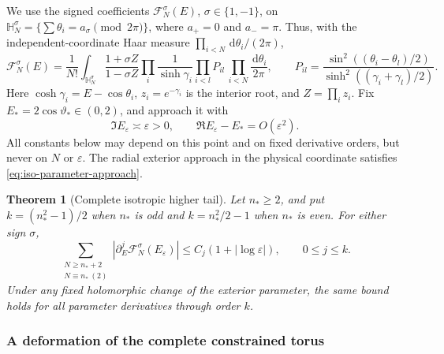 \documentclass[11pt]{article}
\numberwithin{equation}{section}
\newtheorem{theorem}{Theorem}[section]
\theoremstyle{definition}
\newcommand{\dd}{\,\mathrm d}
\newcommand{\eps}{\varepsilon}
\begin{document}
We use the signed coefficients $\mathcal F_N^\sigma({E})$,
$\sigma\in\{1,-1\}$, on
$\mathbb H_N^\sigma=\{\sum\theta_i=a_\sigma\pmod {2\pi}\}$,
where $a_+=0$ and $a_-=\pi$.  Thus, with the independent-coordinate
Haar measure $\prod_{i<N}\dd\theta_i/(2\pi)$,
\begin{equation}\label{eq:iso-tail-coefficient}
 \mathcal F_N^\sigma({E})=\frac1{N!}
 \int_{\mathbb H_N^\sigma}
 \frac{1+\sigma Z}{1-\sigma Z}
 \prod_i\frac1{\sinh\gamma_i}\prod_{i<l}P_{il}\,
 \prod_{i<N}\frac{\dd\theta_i}{2\pi},\qquad
 P_{il}=\frac{\sin^2((\theta_i-\theta_l)/2)}
                {\sinh^2((\gamma_i+\gamma_l)/2)}.
\end{equation}
Here $\cosh\gamma_i={E}-\cos\theta_i$, $z_i=e^{-\gamma_i}$
is the interior root, and $Z=\prod_i z_i$.
Fix ${E}_*=2\cos\vartheta_*\in(0,2)$, and approach it with
\begin{equation}\label{eq:iso-parameter-approach}
 \Im{E}_\eps\asymp\eps>0,
 \qquad \Re{E}_\eps-{E}_*=O(\eps^2).
\end{equation}
All constants below may depend on this point and on fixed derivative
orders, but never on $N$ or $\eps$.  The radial exterior approach in
the physical coordinate satisfies \eqref{eq:iso-parameter-approach}.

\begin{theorem}[Complete isotropic higher tail]\label{iso:tail}
Let $n_*\ge2$, and put $k=(n_*^2-1)/2$ when $n_*$ is odd and
$k=n_*^2/2-1$ when $n_*$ is even.  For either sign $\sigma$,
\begin{equation}\label{eq:iso-complete-tail}
 \sum_{\substack{N\ge n_*+2\\N\equiv n_*\ (2)}}
  |\partial_{{E}}^j\mathcal F_N^\sigma({E}_\eps)|
 \le C_j(1+|\log\eps|),\qquad 0\le j\le k.
\end{equation}
Under any fixed holomorphic change of the exterior parameter, the
same bound holds for all parameter derivatives through order $k$.
\end{theorem}

\subsubsection{A deformation of the complete constrained torus}
\end{document}

